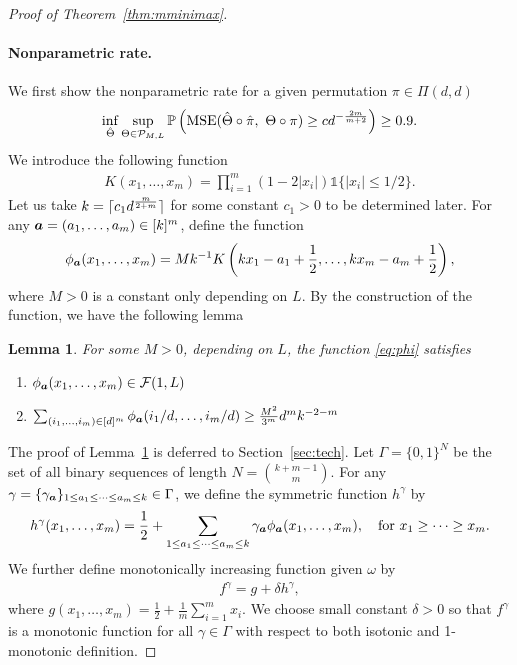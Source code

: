 \documentclass[12pt]{article}
\newtheorem{lem}{Lemma}
\theoremstyle{definition}
\begin{document}
{\begin{proof}[Proof of Theorem~\ref{thm:mminimax}]
\paragraph{Nonparametric rate.}
We first show the nonparametric rate for a given permutation $\pi\in\Pi(d,d)$
\begin{align}\label{eq:nonpara2}
    \inf_{\hat\Theta}\sup_{\Theta\in\tP_{M,L}}\mathbb{P}\left(\textup{MSE}(\hat\Theta\circ\hat\pi,\ \Theta\circ\pi) \geq c d^{-{2m\over m+2}} \right) \geq 0.9.
\end{align}
We introduce the following function
\begin{align}
    K(x_1,\ldots,x_m) = \prod_{i=1}^m (1-2|x_i|)\mathds{1}\{|x_i|\leq 1/2\}.
\end{align}
Let us take $k = \lceil c_1 d^{m\over 2+m}\rceil$ for some constant $c_1>0$ to be determined later. For any $\bm{a} = (a_1,\ldots,a_m)\in [k]^m$, define the function
\begin{align}\label{eq:phi}
    \phi_{\bm{a}}(x_1,\ldots,x_m) = M k^{-1} K\left(kx_1-a_1+\frac{1}{2},\ldots,kx_m-a_m+\frac{1}{2}\right),
\end{align}
where $M>0$ is a constant only depending on $L$.
By the construction of the function, we have the following lemma
\begin{lem}\label{lem:phi}
For some $M>0$, depending on $L$, the function \eqref{eq:phi} satisfies
\begin{enumerate}
    \item $\phi_{\bm{a}}(x_1,\ldots,x_m)\in\mathcal{F}(1,L)$
    \item $\sum_{(i_1,\ldots,i_m)\in[d]^m}\phi_{\bm{a}}(i_1/d,\ldots,i_m/d)\geq \frac{M^2}{3^m}d^mk^{-2-m}$
\end{enumerate}
\end{lem}
The proof of Lemma~\ref{lem:phi} is deferred to Section~\ref{sec:tech}.
Let $\Gamma= \{0,1\}^N$ be the set of all binary sequences of length $N = {k+m-1\choose m}$. For any $\gamma= \{\gamma_{\bm{a}}\}_{1\leq a_1\leq \cdots\leq a_m\leq k}\in\Gamma$, we define the symmetric function $h^{\gamma}$ by 
\begin{align}
    h^{\gamma}(x_1,\ldots,x_m) = \frac{1}{2}+\sum_{1\leq a_1\leq\cdots\leq a_m\leq k}\gamma_{\bm{a}}\phi_{\bm{a}}(x_1,\ldots,x_m),\quad \text{for } x_1\geq\cdots\geq x_m.
\end{align}
We further define monotonically increasing function given $\omega$ by
\begin{align}
    f^{\gamma} = g+\delta h^{\gamma},
\end{align}
 where  $g(x_1,\ldots,x_m) =\frac{1}{2}+\frac{1}{m}\sum_{i = 1}^mx_i$. 
 We choose small constant $\delta>0$ so that $f^{\gamma}$ is a monotonic function for all $\gamma\in\Gamma$ with respect to both isotonic and 1-monotonic definition.
 

\end{proof}}
\end{document}
